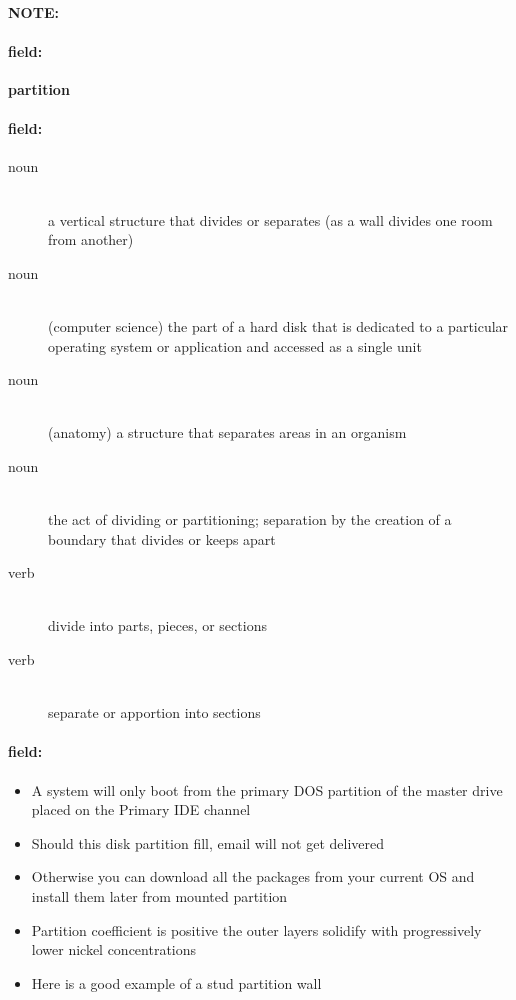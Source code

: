 \documentclass[12pt]{article}
\newenvironment{note}{\paragraph{NOTE:}}{}
\newenvironment{field}{\paragraph{field:}}{}
\begin{document}
\begin{note}
\begin{field}
\textbf{\large partition}
\end{field}


\begin{field}
\begin{description}
\item[noun] \hfill \\ 
a vertical structure that divides or separates (as a wall divides one room from another)

\item[noun] \hfill \\ 
(computer science) the part of a hard disk that is dedicated to a particular operating system or application and accessed as a single unit

\item[noun] \hfill \\ 
(anatomy) a structure that separates areas in an organism

\item[noun] \hfill \\ 
the act of dividing or partitioning; separation by the creation of a boundary that divides or keeps apart

\item[verb] \hfill \\ 
divide into parts, pieces, or sections

\item[verb] \hfill \\ 
separate or apportion into sections

\end{description}
\end{field}

\begin{field}
\begin{itemize}
\item A system will only boot from the primary DOS partition of the master drive placed on the Primary IDE channel
\item Should this disk partition fill, email will not get delivered
\item Otherwise you can download all the packages from your current OS and install them later from mounted partition
\item Partition coefficient is positive the outer layers solidify with progressively lower nickel concentrations
\item Here is a good example of a stud partition wall
\end{itemize}
\end{field}
\end{note}
\end{document}
